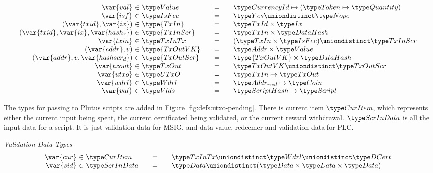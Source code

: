 \begin{figure*}[htb]
\begin{equation*}
\begin{array}{r@{~\in~}l@{\qquad=\qquad}lr}
      \var{val} & \Value
      & \CurrencyId \mapsto (\Token \mapsto \Quantity)
      \\
      \var{isf}
      & \IsFee
      & \Yes \uniondistinct \Nope
      \\
      (\var{txid}, \var{ix})
      & \type{TxIn}
      & \TxId \times \Ix
      \\
      (\var{txid}, \var{ix}, \var{hash_r})
      & \type{TxInScr}
      & \TxIn \times \HashDat
      \\
      \var{txin}
      & \TxInTx
      & (\TxIn \times \IsFee) \uniondistinct \TxInScr
      \\
      (\var{addr}, v)
      & \type{TxOutVK}
      & \Addr \times \Value
      \\
      (\var{addr}, v, \var{hashscr_d})
      & \type{TxOutScr}
      & \type{TxOutVK} \times \HashDat
      \\
      \var{txout}
      & \TxOut
      & \TxOutVK \uniondistinct \TxOutScr
      \\
      \var{utxo}
      & \UTxO
      & \TxIn \mapsto \TxOut
      \\
      \var{wdrl}
      & \Wdrl
      & \AddrRWD \mapsto \Coin
      \\
      \var{val}
      & \Vlds
      & \HashScr \mapsto \Script
    \end{array}
  \end{equation*}
  \caption{Definitions used in the UTxO transition system}
  \label{fig:defs:utxo-shelley-1}
\end{figure*}

The types for passing to Plutus scripts are added in Figure \ref{fig:defs:utxo-pending}.
There is current item $\CurItem$, which represents either the current input being
spent, the current certificated being validated, or the current reward
withdrawal. $\ScrInData$ is all the input data for a script. It is
just validation data for MSIG, and data value, redeemer and validation data for PLC.


\begin{figure*}[htb]
  \emph{Validation Data Types}
  \begin{equation*}
    \begin{array}{r@{~\in~}l@{\qquad=\qquad}l}
      \var{cur}
      & \CurItem
      & \TxInTx \uniondistinct \Wdrl \uniondistinct \DCert
      \\
      \var{sid}
      & \ScrInData
      & \Data \uniondistinct
        (\Data \times \Data \times \Data)
    \end{array}
  \end{equation*}
  \caption{Definitions used to make Validation Data}
  \label{fig:defs:utxo-pending}
\end{figure*}


